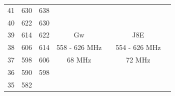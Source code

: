 \begin{longtable}[H]{|p{1cm}|p{1cm}|p{1cm}|cc|cc|}
                \cellcolor[HTML]{9AFF99}41 &
                  \cellcolor[HTML]{9AFF99}630 &
                  \cellcolor[HTML]{9AFF99}638 &
                  \multicolumn{1}{c|}{\cellcolor[HTML]{FCFF2F}} &
                  \cellcolor[HTML]{F8A102} &
                  \multicolumn{1}{c|}{\cellcolor[HTML]{FCFF2F}} &
                  \cellcolor[HTML]{F8A102} \\ \cline{1-3}
                \cellcolor[HTML]{9AFF99}40 &
                  \cellcolor[HTML]{9AFF99}622 &
                  \cellcolor[HTML]{9AFF99}630 &
                  \multicolumn{1}{c|}{\cellcolor[HTML]{FCFF2F}} &
                  \cellcolor[HTML]{F8A102} &
                  \multicolumn{1}{c|}{\cellcolor[HTML]{FCFF2F}} &
                  \cellcolor[HTML]{F8A102} \\ \cline{1-4} \cline{6-6}
                \cellcolor[HTML]{9AFF99}39 &
                  \cellcolor[HTML]{9AFF99}614 &
                  \cellcolor[HTML]{9AFF99}622 &
                  \multicolumn{1}{c|}{\cellcolor[HTML]{FF2CFE}Gw} &
                  \cellcolor[HTML]{F8A102} &
                  \multicolumn{1}{c|}{\cellcolor[HTML]{FF2CFE}J8E} &
                  \cellcolor[HTML]{F8A102} \\ \cline{1-3}
                \cellcolor[HTML]{9AFF99}38 &
                  \cellcolor[HTML]{9AFF99}606 &
                  \cellcolor[HTML]{9AFF99}614 &
                  \multicolumn{1}{c|}{\cellcolor[HTML]{FF2CFE}558 - 626 MHz} &
                  \cellcolor[HTML]{F8A102} &
                  \multicolumn{1}{c|}{\cellcolor[HTML]{FF2CFE}554 - 626 MHz} &
                  \cellcolor[HTML]{F8A102} \\ \cline{1-3} \cline{5-5}
                \cellcolor[HTML]{FFCCC9}37 &
                  \cellcolor[HTML]{FFCCC9}598 &
                  \cellcolor[HTML]{FFCCC9}606 &
                  \multicolumn{1}{c|}{\cellcolor[HTML]{FF2CFE}68 MHz} &
                   &
                  \multicolumn{1}{c|}{\cellcolor[HTML]{FF2CFE}72 MHz} &
                  \cellcolor[HTML]{F8A102} \\ \cline{1-3}
                \cellcolor[HTML]{FFCCC9}36 &
                  \cellcolor[HTML]{FFCCC9}590 &
                  \cellcolor[HTML]{FFCCC9}598 &
                  \multicolumn{1}{c|}{\cellcolor[HTML]{FF2CFE}} &
                   &
                  \multicolumn{1}{c|}{\cellcolor[HTML]{FF2CFE}} &
                  \cellcolor[HTML]{F8A102} \\ \cline{1-3} \cline{7-7} 
                \cellcolor[HTML]{FFCCC9}35 &
                  \cellcolor[HTML]{FFCCC9}582 &

\end{longtable}
